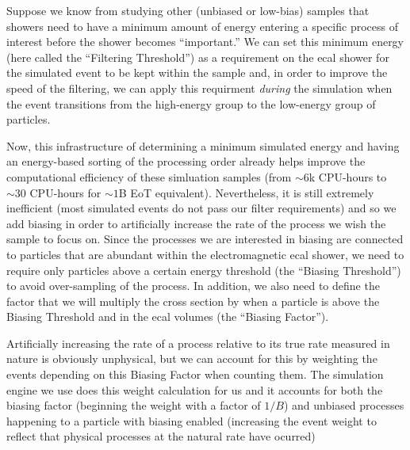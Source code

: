 Suppose we know from studying other (unbiased or low-bias) samples that showers need to have
a minimum amount of energy entering a specific process of interest before the shower
becomes ``important.''
We can set this minimum energy (here called the ``Filtering Threshold'') as a requirement on
the \ac{ecal} shower for the simulated event to be kept within the sample and, in order to
improve the speed of the filtering, we can apply this requirment \emph{during} the simulation
when the event transitions from the high-energy group to the low-energy group of particles.

Now, this infrastructure of determining a minimum simulated energy and having an energy-based
sorting of the processing order already helps improve the computational efficiency of these 
simluation samples (from $\sim 6$k CPU-hours to $\sim 30$ CPU-hours for $\sim 1$B EoT equivalent).
Nevertheless, it is still extremely inefficient (most simulated events do not pass our filter requirements)
and so we add biasing in order to artificially increase the rate of the process we wish the sample to focus on.
Since the processes we are interested in biasing are connected to particles that are abundant
within the electromagnetic \ac{ecal} shower, we need to require only particles above a
certain energy threshold (the ``Biasing Threshold'') to avoid over-sampling of the process.
In addition, we also need to define the factor that we will multiply the cross section by
when a particle is above the Biasing Threshold and in the \ac{ecal} volumes (the ``Biasing Factor'').

Artificially increasing the rate of a process relative to its true rate measured in nature
is obviously unphysical, but we can account for this by weighting the events depending on this
Biasing Factor when counting them.
The simulation engine we use does this weight calculation for us and it accounts for both the
biasing factor (beginning the weight with a factor of $1/B$) and unbiased processes happening
to a particle with biasing enabled (increasing the event weight to reflect that physical processes
at the natural rate have ocurred)

